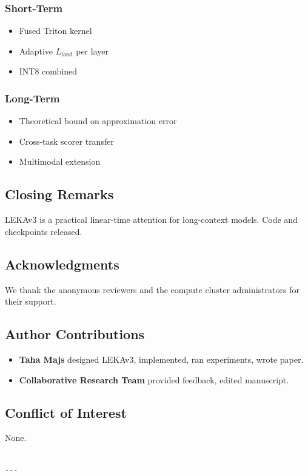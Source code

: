 \subsubsection{Short-Term}
\begin{itemize}
\item Fused Triton kernel
\item Adaptive $L_\text{land}$ per layer
\item INT8 combined

\end{itemize}
\subsubsection{Long-Term}
\begin{itemize}
\item Theoretical bound on approximation error
\item Cross-task scorer transfer
\item Multimodal extension

\end{itemize}
\subsection{Closing Remarks}

LEKAv3 is a practical linear-time attention for long-context models. Code 
and checkpoints released.

\subsection{Acknowledgments}

We thank the anonymous reviewers and the compute cluster administrators for their support.

\subsection{Author Contributions}

\begin{itemize}
\item \textbf{Taha Majs} designed LEKAv3, implemented, ran experiments, wrote paper.
\item \textbf{Collaborative Research Team} provided feedback, edited manuscript.

\end{itemize}
\subsection{Conflict of Interest}

None.
\begin{lstlisting}

---
\end{lstlisting}